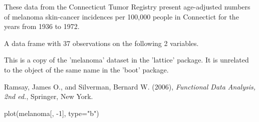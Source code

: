 \begin{Description}\relax
These data from the Connecticut Tumor Registry present
age-adjusted numbers of melanoma skin-cancer incidences per
100,000 people in Connectict for the years from 1936 to 1972.
\end{Description}
\begin{Format}\relax
A data frame with 37 observations on the following 2 variables.
\end{Format}
\begin{Details}\relax
This is a copy of the 'melanoma' dataset in the 'lattice' package.  It
is unrelated to the object of the same name in the 'boot' package.
\end{Details}
\begin{Source}\relax
Ramsay, James O., and Silverman, Bernard W. (2006), \emph{Functional
Data Analysis, 2nd ed.}, Springer, New York.
\end{Source}
\begin{SeeAlso}\relax
{}
\end{SeeAlso}
\begin{Examples}
\begin{ExampleCode}
plot(melanoma[, -1], type="b")
\end{ExampleCode}
\end{Examples}

